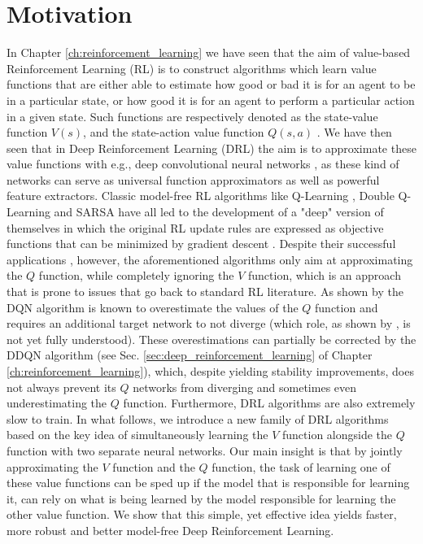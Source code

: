 \section{Motivation}
\label{sec:ijcnn_introduction}

In Chapter \ref{ch:reinforcement_learning} we have seen that the aim of value-based Reinforcement Learning (RL) is to construct algorithms which learn value functions that are either able to estimate how good or bad it is for an agent to be in a particular state, or how good it is for an agent to perform a particular action in a given state. Such functions are respectively denoted as the state-value function $V(s)$, and the state-action value function $Q(s,a)$ \cite{sutton2018reinforcement}. We have then seen that in Deep Reinforcement Learning (DRL) the aim is to approximate these value functions with e.g., deep convolutional neural networks \cite{lecun2015deep}, as these kind of networks can serve as universal function approximators as well as powerful feature extractors. Classic model-free RL algorithms like Q-Learning \cite{watkins1992q}, Double Q-Learning \cite{hasselt2010double} and SARSA \cite{rummery1994line} have all led to the development of a "deep" version of themselves in which the original RL update rules are expressed as objective functions that can be minimized by gradient descent \cite{mnih2015human, van2016deep, zhao2016deep}. Despite their successful applications \cite{li2017deep}, however, the aforementioned algorithms only aim at approximating the $Q$ function, while completely ignoring the $V$ function, which is an approach that is prone to issues that go back to standard RL literature. As shown by \citet{van2016deep} the DQN algorithm \cite{mnih2015human} is known to overestimate the values of the $Q$ function and requires an additional target network to not diverge (which role, as shown by \citet{achiam2019towards}, is not yet fully understood). These overestimations can partially be corrected by the DDQN \cite{van2016deep} algorithm (see Sec. \ref{sec:deep_reinforcement_learning} of Chapter \ref{ch:reinforcement_learning}), which, despite yielding stability improvements, does not always prevent its $Q$ networks from diverging \cite{van2018deep_triad} and sometimes even underestimating the $Q$ function. Furthermore, DRL algorithms are also extremely slow to train. In what follows, we introduce a new family of DRL algorithms based on the key idea of simultaneously learning the $V$ function alongside the $Q$ function with two separate neural networks. Our main insight is that by jointly approximating the $V$ function and the $Q$ function, the task of learning one of these value functions can be sped up if the model that is responsible for learning it, can rely on what is being learned by the model responsible for learning the other value function. We show that this simple, yet effective idea yields faster, more robust and better model-free Deep Reinforcement Learning.


